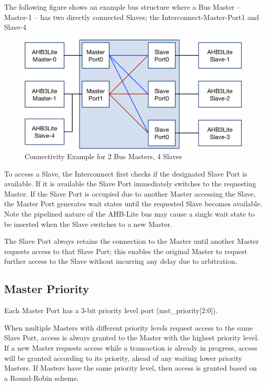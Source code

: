 The following figure shows an example bus structure where a Bus Master -- Master-1
-- has two directly connected Slaves; the Interconnect-Master-Port1 and
Slave-4

\begin{figure}[tbh]
	\includegraphics{assets/img/ahb-lite-switch-sys2.png}
	\caption{Connectivity Example for 2 Bus Masters, 4 Slaves}
	\label{fig:ahb-lite-switch-sys2}
\end{figure}



To access a Slave, the Interconnect first checks if the designated Slave
Port is available. If it is available the Slave Port immediately
switches to the requesting Master. If the Slave Port is occupied due to
another Master accessing the Slave, the Master Port generates wait
states until the requested Slave becomes available. Note the pipelined
nature of the AHB-Lite bus may cause a single wait state to be inserted
when the Slave switches to a new Master.

The Slave Port always retains the connection to the Master until another
Master requests access to that Slave Port; this enables the original
Master to request further access to the Slave without incurring any
delay due to arbitration.

\subsection{Master Priority}\label{master-priority}

Each Master Port has a 3-bit priority level port
(mst\_priority[2:0]).

When multiple Masters with different priority levels request access to
the same Slave Port, access is always granted to the Master with the
highest priority level. If a new Master requests access while a
transaction is already in progress, access will be granted according to
its priority, ahead of any waiting lower priority Masters. If Masters
have the same priority level, then access is granted based on a
Round-Robin scheme.

